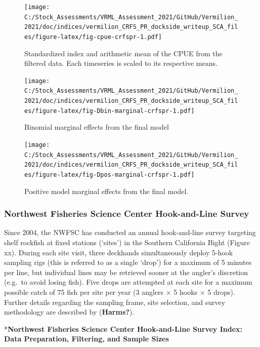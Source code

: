 \documentclass[
  english,
  a4paper,
]{article}
\begin{document}
\begin{figure}
\centering
\texttt{[image: C:/Stock\_Assessments/VRML\_Assessment\_2021/GitHub/Vermilion\_2021/doc/indices/vermilion\_CRFS\_PR\_dockside\_writeup\_SCA\_files/figure-latex/fig-cpue-crfspr-1.pdf]}
\caption{\label{fig:fig-cpue-crfspr}Standardized index and arithmetic mean of the CPUE from the filtered data. Each timeseries is scaled to its respective means.}
\end{figure}

\begin{figure}
\centering
\texttt{[image: C:/Stock\_Assessments/VRML\_Assessment\_2021/GitHub/Vermilion\_2021/doc/indices/vermilion\_CRFS\_PR\_dockside\_writeup\_SCA\_files/figure-latex/fig-Dbin-marginal-crfspr-1.pdf]}
\caption{\label{fig:fig-Dbin-marginal-crfspr}Binomial marginal effects from the final model}
\end{figure}

\begin{figure}
\centering
\texttt{[image: C:/Stock\_Assessments/VRML\_Assessment\_2021/GitHub/Vermilion\_2021/doc/indices/vermilion\_CRFS\_PR\_dockside\_writeup\_SCA\_files/figure-latex/fig-Dpos-marginal-crfspr-1.pdf]}
\caption{\label{fig:fig-Dpos-marginal-crfspr}Positive model marginal effects from the final model.}
\end{figure}

\clearpage

\hypertarget{northwest-fisheries-science-center-hook-and-line-survey}{%
\subsubsection{Northwest Fisheries Science Center Hook-and-Line Survey}\label{northwest-fisheries-science-center-hook-and-line-survey}}

Since 2004, the NWFSC has conducted an annual hook-and-line survey targeting shelf rockfish at fixed stations (`sites') in the Southern California Bight (Figure xx). During each site visit, three deckhands simultaneously deploy 5-hook sampling rigs (this is referred to as a single `drop') for a maximum of 5 minutes per line, but individual lines may be retrieved sooner at the angler's discretion (e.g.~to avoid losing fish). Five drops are attempted at each site for a maximum possible catch of 75 fish per site per year (3 anglers × 5 hooks × 5 drops). Further details regarding the sampling frame, site selection, and survey methodology are described by (\textbf{Harms?}).

*\textbf{Northwest Fisheries Science Center Hook-and-Line Survey Index: Data Preparation, Filtering, and Sample Sizes}
\end{document}
